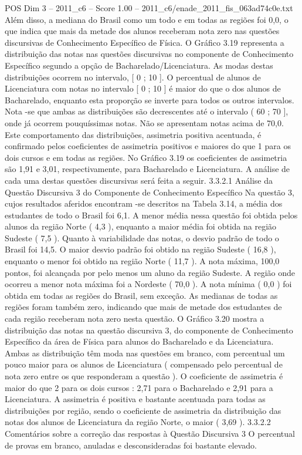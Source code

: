 \begin{textsample}{POS Dim 3 – 2011\_c6 – Score 1.00 – 2011\_c6/enade\_2011\_fis\_063ad74c0e.txt}
Além disso, a mediana do Brasil como um todo e em todas as regiões foi 0,0, o que indica que mais da metade dos alunos receberam nota zero nas questões discursivas de Conhecimento Específico de Física.
O Gráfico 3.19 representa a distribuição das notas nas questões discursivas no componente de Conhecimento Específico segundo a opção de Bacharelado/Licenciatura.
As modas destas distribuições ocorrem no intervalo, [ 0 ; 10 ].
O percentual de alunos de Licenciatura com notas no intervalo [ 0 ; 10 ] é maior do que o dos alunos de Bacharelado, enquanto esta proporção se inverte para todos os outros intervalos.
Nota -se que ambas as distribuições são decrescentes até o intervalo ( 60 ; 70 ], onde já ocorrem pouquíssimas notas.
Não se apresentam notas acima de 70,0.
Este comportamento das distribuições, assimetria positiva acentuada, é confirmado pelos coeficientes de assimetria positivos e maiores do que 1 para os dois cursos e em todas as regiões.
No Gráfico 3.19 os coeficientes de assimetria são 1,91 e 3,01, respectivamente, para Bacharelado e Licenciatura.
A análise de cada uma destas questões discursivas será feita a seguir. 3.3.2.1 Análise da Questão Discursiva 3 do Componente de Conhecimento Específico Na questão 3, cujos resultados aferidos encontram -se descritos na Tabela 3.14, a média dos estudantes de todo o Brasil foi 6,1.
A menor média nessa questão foi obtida pelos alunos da região Norte ( 4,3 ), enquanto a maior média foi obtida na região Sudeste ( 7,5 ).
Quanto à variabilidade das notas, o desvio padrão de todo o Brasil foi 14,5.
O maior desvio padrão foi obtido na região Sudeste ( 16,8 ), enquanto o menor foi obtido na região Norte ( 11,7 ).
A nota máxima, 100,0 pontos, foi alcançada por pelo menos um aluno da região Sudeste.
A região onde ocorreu a menor nota máxima foi a Nordeste ( 70,0 ).
A nota mínima ( 0,0 ) foi obtida em todas as regiões do Brasil, sem exceção.
As medianas de todas as regiões foram também zero, indicando que mais de metade dos estudantes de cada região receberam nota zero nesta questão.
O Gráfico 3.20 mostra a distribuição das notas na questão discursiva 3, do componente de Conhecimento Específico da área de Física para alunos do Bacharelado e da Licenciatura.
Ambas as distribuição têm moda nas questões em branco, com percentual um pouco maior para os alunos de Licenciatura ( compensado pelo percentual de nota zero entre os que responderam a questão ).
O coeficiente de assimetria é maior do que 2 para os dois cursos : 2,71 para o Bacharelado e 2,91 para a Licenciatura.
A assimetria é positiva e bastante acentuada para todas as distribuições por região, sendo o coeficiente de assimetria da distribuição das notas dos alunos de Licenciatura da região Norte, o maior ( 3,69 ). 3.3.2.2 Comentários sobre a correção das respostas à Questão Discursiva 3 O percentual de provas em branco, anuladas e desconsideradas foi bastante elevado.

\end{textsample}
